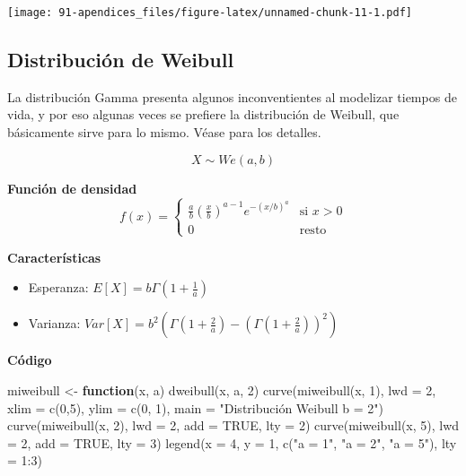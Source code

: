 \documentclass[
]{book}
\newenvironment{Shaded}{\begin{snugshade}}{\end{snugshade}}
\newcommand{\AttributeTok}[1]{\textcolor[rgb]{0.77,0.63,0.00}{#1}}
\newcommand{\ConstantTok}[1]{\textcolor[rgb]{0.00,0.00,0.00}{#1}}
\newcommand{\ControlFlowTok}[1]{\textcolor[rgb]{0.13,0.29,0.53}{\textbf{#1}}}
\newcommand{\DecValTok}[1]{\textcolor[rgb]{0.00,0.00,0.81}{#1}}
\newcommand{\FunctionTok}[1]{\textcolor[rgb]{0.00,0.00,0.00}{#1}}
\newcommand{\NormalTok}[1]{#1}
\newcommand{\OtherTok}[1]{\textcolor[rgb]{0.56,0.35,0.01}{#1}}
\newcommand{\SpecialCharTok}[1]{\textcolor[rgb]{0.00,0.00,0.00}{#1}}
\newcommand{\StringTok}[1]{\textcolor[rgb]{0.31,0.60,0.02}{#1}}
\providecommand{\tightlist}{%
  \setlength{\itemsep}{0pt}\setlength{\parskip}{0pt}}
\begin{document}
\texttt{[image: 91-apendices\_files/figure-latex/unnamed-chunk-11-1.pdf]}

\hypertarget{distribuciuxf3n-de-weibull}{%
\subsection{Distribución de Weibull}\label{distribuciuxf3n-de-weibull}}

La distribución Gamma presenta algunos inconventientes al modelizar tiempos de vida, y por eso algunas veces se prefiere la distribución de Weibull, que básicamente sirve para lo mismo. Véase \cite{ugarte2015} para los detalles.

\[X \sim \mathit{We}(a, b) \]

\textbf{Función de densidad}
\[f(x) =
\begin{cases}
\frac{a}{b}\left (\frac{x}{b} \right)^{a-1}e^{-(x/b)^a} & \text{si } x > 0\\
0 & \text{resto }
\end{cases}\]

\textbf{Características}

\begin{itemize}
\tightlist
\item
  Esperanza: \(E[X] =b \Gamma\left (1 + \frac{1}{a} \right )\)
\item
  Varianza: \(\mathit{Var}[X] = b^2 \left ( \Gamma \left (  1 + \frac{2}{a} \right  )  - \left ( \Gamma \left (1 + \frac{2}{a} \right ) \right )^2 \right )\)
\end{itemize}

\textbf{Código}

\begin{Shaded}
\begin{Highlighting}[]
\NormalTok{miweibull }\OtherTok{\textless{}{-}} \ControlFlowTok{function}\NormalTok{(x, a) }\FunctionTok{dweibull}\NormalTok{(x, a, }\DecValTok{2}\NormalTok{)}
\FunctionTok{curve}\NormalTok{(}\FunctionTok{miweibull}\NormalTok{(x, }\DecValTok{1}\NormalTok{), }\AttributeTok{lwd =} \DecValTok{2}\NormalTok{, }\AttributeTok{xlim =} \FunctionTok{c}\NormalTok{(}\DecValTok{0}\NormalTok{,}\DecValTok{5}\NormalTok{), }
      \AttributeTok{ylim =} \FunctionTok{c}\NormalTok{(}\DecValTok{0}\NormalTok{, }\DecValTok{1}\NormalTok{),}
      \AttributeTok{main =} \StringTok{"Distribución Weibull b = 2"}\NormalTok{)}
\FunctionTok{curve}\NormalTok{(}\FunctionTok{miweibull}\NormalTok{(x, }\DecValTok{2}\NormalTok{), }\AttributeTok{lwd =} \DecValTok{2}\NormalTok{, }\AttributeTok{add =} \ConstantTok{TRUE}\NormalTok{, }\AttributeTok{lty =} \DecValTok{2}\NormalTok{)}
\FunctionTok{curve}\NormalTok{(}\FunctionTok{miweibull}\NormalTok{(x, }\DecValTok{5}\NormalTok{), }\AttributeTok{lwd =} \DecValTok{2}\NormalTok{, }\AttributeTok{add =} \ConstantTok{TRUE}\NormalTok{, }\AttributeTok{lty =} \DecValTok{3}\NormalTok{)}
\FunctionTok{legend}\NormalTok{(}\AttributeTok{x =} \DecValTok{4}\NormalTok{, }\AttributeTok{y =} \DecValTok{1}\NormalTok{, }\FunctionTok{c}\NormalTok{(}\StringTok{"a = 1"}\NormalTok{, }\StringTok{"a = 2"}\NormalTok{, }\StringTok{"a = 5"}\NormalTok{), }\AttributeTok{lty =} \DecValTok{1}\SpecialCharTok{:}\DecValTok{3}\NormalTok{)}
\end{Highlighting}
\end{Shaded}
\end{document}
